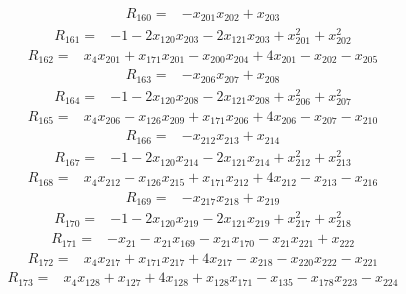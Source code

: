 \[\begin{aligned}R_{160}={}&-x_{201}x_{202}+x_{203}
\end{aligned}\]
\[\begin{aligned}R_{161}={}&-1-2x_{120}x_{203}-2x_{121}x_{203}+x_{201}^{2}+x_{202}^{2}
\end{aligned}\]
\[\begin{aligned}R_{162}={}&x_{4}x_{201}+x_{171}x_{201}-x_{200}x_{204}+4x_{201}-x_{202}-x_{205}
\end{aligned}\]
\[\begin{aligned}R_{163}={}&-x_{206}x_{207}+x_{208}
\end{aligned}\]
\[\begin{aligned}R_{164}={}&-1-2x_{120}x_{208}-2x_{121}x_{208}+x_{206}^{2}+x_{207}^{2}
\end{aligned}\]
\[\begin{aligned}R_{165}={}&x_{4}x_{206}-x_{126}x_{209}+x_{171}x_{206}+4x_{206}-x_{207}-x_{210}
\end{aligned}\]
\[\begin{aligned}R_{166}={}&-x_{212}x_{213}+x_{214}
\end{aligned}\]
\[\begin{aligned}R_{167}={}&-1-2x_{120}x_{214}-2x_{121}x_{214}+x_{212}^{2}+x_{213}^{2}
\end{aligned}\]
\[\begin{aligned}R_{168}={}&x_{4}x_{212}-x_{126}x_{215}+x_{171}x_{212}+4x_{212}-x_{213}-x_{216}
\end{aligned}\]
\[\begin{aligned}R_{169}={}&-x_{217}x_{218}+x_{219}
\end{aligned}\]
\[\begin{aligned}R_{170}={}&-1-2x_{120}x_{219}-2x_{121}x_{219}+x_{217}^{2}+x_{218}^{2}
\end{aligned}\]
\[\begin{aligned}R_{171}={}&-x_{21}-x_{21}x_{169}-x_{21}x_{170}-x_{21}x_{221}+x_{222}
\end{aligned}\]
\[\begin{aligned}R_{172}={}&x_{4}x_{217}+x_{171}x_{217}+4x_{217}-x_{218}-x_{220}x_{222}-x_{221}
\end{aligned}\]
\[\begin{aligned}R_{173}={}&x_{4}x_{128}+x_{127}+4x_{128}+x_{128}x_{171}-x_{135}-x_{178}x_{223}-x_{224}
\end{aligned}\]
